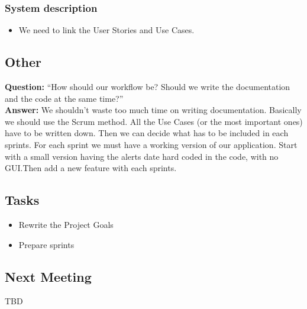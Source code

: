     \subsubsection*{System description}
    \begin{itemize}
        \item We need to link the User Stories and Use Cases.
    \end{itemize}
    \subsection*{Other}
    \textbf{Question:} ``How should our workflow be? Should we write the
    documentation and the code at the same time?''\\
    \textbf{Answer:} We shouldn't waste too much time on writing documentation.
    Basically we should use the Scrum method. All the Use Cases (or the most
    important ones) have to be written down. Then we can decide what has to
    be included in each sprints. For each sprint we must have a working version
    of our application. Start with a small version having the alerts date
    hard coded in the code, with no GUI.\@ Then add a new feature with each
    sprints.
\subsection*{Tasks}
    \begin{itemize}
        \item Rewrite the Project Goals
        \item Prepare sprints
    \end{itemize}
\subsection*{Next Meeting}
TBD
